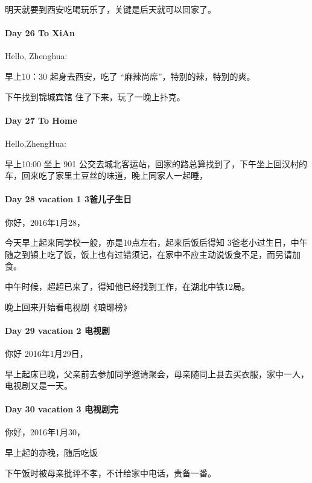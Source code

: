 \documentclass[UTF8,a4paper,8pt]{ctexbook}
\begin{document}
	     明天就要到西安吃喝玩乐了，关键是后天就可以回家了。
     \paragraph{Day 26   To XiAn   \quad  }
	     Hello, Zhenghua:
	     
	     早上10：30 起身去西安，吃了 “麻辣尚席”，特别的辣，特别的爽。
	     
	     下午找到锦城宾馆 住了下来，玩了一晚上扑克。
	     
	     
     \paragraph{Day 27   To Home   \quad     }
	     Hello,ZhengHua:
	     
	     早上10:00  坐上 901 公交去城北客运站，回家的路总算找到了，下午坐上回汉村的车，回来吃了家里土豆丝的味道，晚上同家人一起睡，
	     
     \paragraph{Day 28   vacation 1   \quad     3爸儿子生日}
	     你好，2016年1月28，
	     
	     今天早上起来同学校一般，亦是10点左右，起来后饭后得知  3爸老小过生日，中午随之到镇上吃了饭，饭上也有过错须记，在家中不应主动说饭食不足，而另请加食。
	     
	     中午时候，超超已来了，得知他已经找到工作，在湖北中铁12局。
	     
	     晚上回来开始看电视剧《琅琊榜》
	     
     \paragraph{Day 29   vacation 2   \quad    电视剧 }   
	     你好 2016年1月29日，
	     
	     早上起床已晚，父亲前去参加同学邀请聚会，母亲随同上县去买衣服，家中一人，电视剧又是一天。
	     
     \paragraph{Day 30   vacation 3      \quad  电视剧完   }
	     你好，2016年1月30，
	     
	     早上起的亦晚，随后吃饭
	     
	     下午饭时被母亲批评不孝，不计给家中电话，责备一番。
	     
\end{document}
